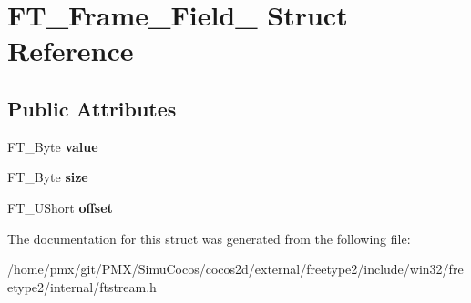\hypertarget{structFT__Frame__Field__}{}\section{F\+T\+\_\+\+Frame\+\_\+\+Field\+\_\+ Struct Reference}
\label{structFT__Frame__Field__}
\subsection*{Public Attributes}
\begin{DoxyCompactItemize}
\item 
\mbox{\label{structFT__Frame__Field___a10f91dcdd0a582727b67ad45d42bab41}} 
F\+T\+\_\+\+Byte {\bfseries value}
\item 
\mbox{\label{structFT__Frame__Field___a47e6fbcb90c079421d9d9b64f63a587e}} 
F\+T\+\_\+\+Byte {\bfseries size}
\item 
\mbox{\label{structFT__Frame__Field___a85c3275fbb7044f7d6880020b6f0f794}} 
F\+T\+\_\+\+U\+Short {\bfseries offset}
\end{DoxyCompactItemize}


The documentation for this struct was generated from the following file\+:\begin{DoxyCompactItemize}
\item 
/home/pmx/git/\+P\+M\+X/\+Simu\+Cocos/cocos2d/external/freetype2/include/win32/freetype2/internal/ftstream.\+h\end{DoxyCompactItemize}
